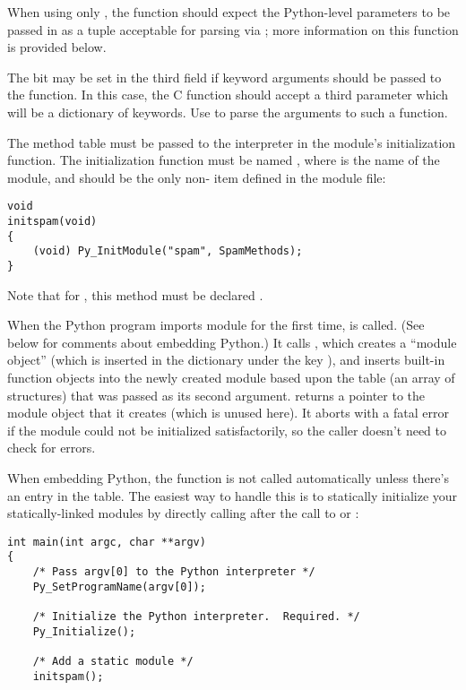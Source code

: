 When using only , the function should expect
the Python-level parameters to be passed in as a tuple acceptable for
parsing via ; more information on this
function is provided below.

The  bit may be set in the third field if
keyword arguments should be passed to the function.  In this case, the
C function should accept a third  parameter which
will be a dictionary of keywords.  Use
 to parse the arguments to
such a function.

The method table must be passed to the interpreter in the module's
initialization function.  The initialization function must be named
, where  is the name of the
module, and should be the only non- item defined in
the module file:

\begin{verbatim}
void
initspam(void)
{
    (void) Py_InitModule("spam", SpamMethods);
}
\end{verbatim}

Note that for \Cpp, this method must be declared .

When the Python program imports module  for the first
time,  is called. (See below for comments about
embedding Python.)  It calls
, which creates a ``module object'' (which
is inserted in the dictionary  under the key
), and inserts built-in function objects into the newly
created module based upon the table (an array of 
structures) that was passed as its second argument.
 returns a pointer to the module object
that it creates (which is unused here).  It aborts with a fatal error
if the module could not be initialized satisfactorily, so the caller
doesn't need to check for errors.

When embedding Python, the  function is not
called automatically unless there's an entry in the
 table.  The easiest way to handle this is to 
statically initialize your statically-linked modules by directly
calling  after the call to
 or :

\begin{verbatim}
int main(int argc, char **argv)
{
    /* Pass argv[0] to the Python interpreter */
    Py_SetProgramName(argv[0]);

    /* Initialize the Python interpreter.  Required. */
    Py_Initialize();

    /* Add a static module */
    initspam();
\end{verbatim}

